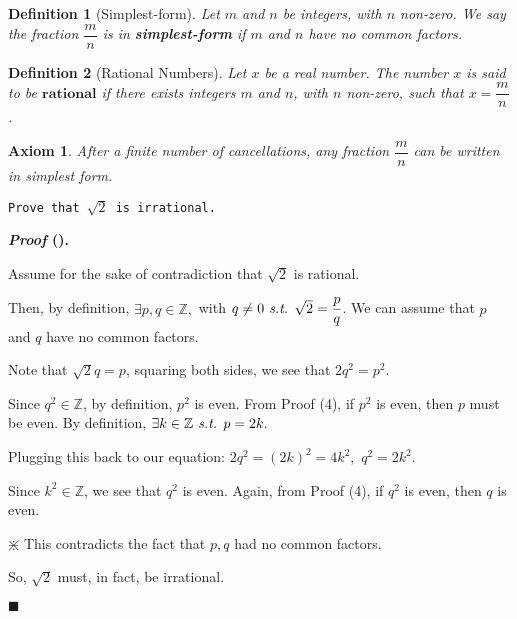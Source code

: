 \documentclass[12pt,a4paper]{article}
\newtheorem{ax}{Axiom}[section]
\newtheorem{df}{Definition}[subsection]
\newcounter{nprf}[subsection]
\newenvironment*{prf}{\par\indent\textbf{\textit{Proof} (\stepcounter{nprf}\thenprf). }\par }{\par\hfill $\blacksquare$\par}
\def\Z{{\mathbb{Z}}}
\def\st{\emph{ s.t. }}
\begin{document}
\begin{df}[Simplest-form]
	Let $m$ and $n$ be integers, with $n$ non-zero. We say the fraction $\dfrac{m}{n}$ is in \textbf{simplest-form} if $m$ and $n$ have no common factors.	
\end{df}
\begin{df}[Rational Numbers]
	Let $x$ be a real number. The number $x$ is said to be $\textbf{rational}$ if there exists integers $m$ and $n$, with $n$ non-zero, such that $x=\dfrac{m}{n}$.	
\end{df}
\begin{ax}
	After a finite number of cancellations, any	fraction $\dfrac{m}{n}$ can be written in simplest form. 
\end{ax}
\begin{framed}
\noindent\texttt{Prove that $\sqrt{2}$ is irrational.}
\begin{prf}
	Assume for the sake of contradiction that $\sqrt{2}$ is rational. \par Then, by definition, $\exists p,q\in\Z,$ with $q\neq0\st\sqrt{2}=\dfrac{p}{q}$. We can assume that $p$ and $q$ have no common factors. \par Note that $\sqrt{2}q=p$, squaring both sides, we see that $2q^2=p^2$.\par Since $q^2\in\Z$, by definition, $p^2$ is even. From Proof (4), if $p^2$ is even, then $p$ must be even. By definition, $\exists k\in\Z\st p=2k.$\par Plugging this back to our equation: $2q^2=(2k)^2=4k^2,$ $q^2=2k^2$.\par Since $k^2\in\Z$, we see that $q^2$ is even. Again, from Proof (4), if $q^2$ is even, then $q$ is even. \par \begin{center}$\divideontimes$ This contradicts the fact that $p,q$ had no common factors.\end{center}\par So, $\sqrt{2}$ must, in fact, be irrational. 
\end{prf}	
\end{framed}
\end{document}

